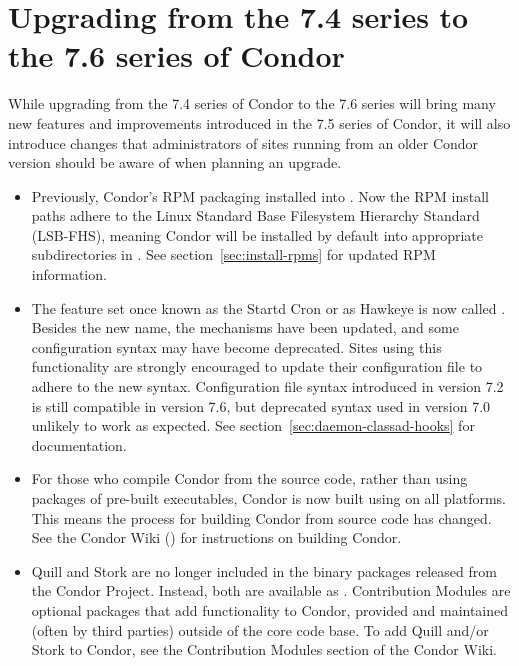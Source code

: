 \section{\label{sec:gotchas}Upgrading from the 7.4 series to the 7.6 series of Condor}

While upgrading from the 7.4 series of Condor to the 7.6 series will
bring many new features and improvements introduced in the 7.5 series of
Condor, it will also introduce changes that administrators of sites
running from an older Condor version should be aware of when
planning an upgrade.

\begin{itemize}

\item  Previously, Condor's RPM packaging installed into . Now
	the RPM install paths adhere to the Linux Standard Base Filesystem
	Hierarchy Standard (LSB-FHS), meaning Condor will be installed by default
	into appropriate subdirectories in .  See
	section~\ref{sec:install-rpms} for updated RPM information. 

\item  The feature set once known as the Startd Cron or as Hawkeye is now
	called .  Besides the new name, the mechanisms
	have been updated, and some configuration syntax may have become
	deprecated. Sites using this functionality are strongly encouraged to
	update their configuration file to adhere to the new syntax. Configuration
	file syntax introduced in version 7.2 is still compatible in version 7.6,
	but deprecated syntax used in version 7.0 unlikely to work as expected.
	See section~\ref{sec:daemon-classad-hooks} for documentation.

\item  For those who compile Condor from the source code, rather than using
	packages of pre-built executables, Condor is now built using 
	on all platforms. This means the process for building Condor from source
	code has changed. See the Condor Wiki
	() for instructions on building Condor.

\item  Quill and Stork are no longer included in the binary packages
	released from the Condor Project. Instead, both are available as
	. Contribution Modules are optional packages
	that  add functionality to Condor,  provided and maintained (often by
	third parties) outside of the core code base. To add Quill and/or Stork to
	Condor, see the Contribution Modules section of the Condor Wiki.


\end{itemize}
